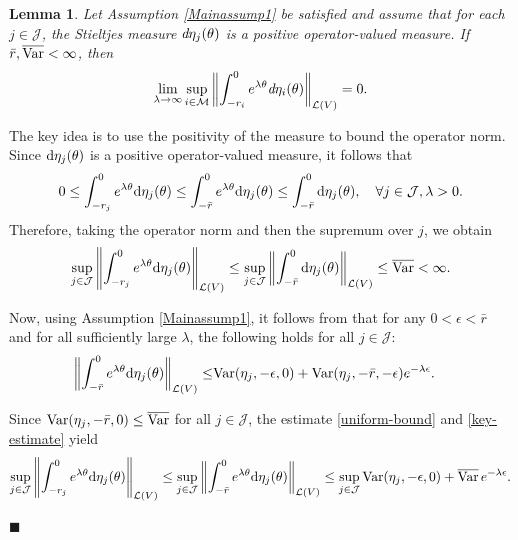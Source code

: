 \documentclass[onecolumn]{autart}
\newtheorem{lemma}{Lemma}[section]
\numberwithin{equation}{section}
\newenvironment{proof}{{\it Proof: \enspace}}{\hfill $\blacksquare$\par}
\begin{document}
	\begin{lemma}\label{tool}
		Let Assumption \ref{Mainassump1} be satisfied and assume that for each $ j \in \mathcal{J} $, the Stieltjes measure $  \emph{d} \eta_j(\theta)$ is a positive operator-valued measure. If $ \bar{r}, \overline{{\rm Var}}< \infty $, then
		\begin{align*}
			\lim_{\lambda \to \infty} \sup_{i \in \mathcal{M}} \left\| \int_{-r_i}^{0} e^{\lambda \theta} \emph{d}\eta_i(\theta) \right\|_{\mathcal{L}(V)} = 0.
		\end{align*}
	\end{lemma}
	\begin{proof}
		The key idea is to use the positivity of the measure to bound the operator norm. Since ${\rm d}\eta_j(\theta)$ is a positive operator-valued measure, it follows that
		\begin{align*}
			0 \le \int_{-r_j}^{0} e^{\lambda \theta} {\rm d}\eta_j(\theta) \le \int_{-\bar{r}}^{0} e^{\lambda \theta} {\rm d}\eta_j(\theta) \le \int_{-\bar{r}}^{0} {\rm d}\eta_j(\theta),\quad \forall j\in \mathcal{J},\lambda>0.
		\end{align*}
		Therefore, taking the operator norm and then the supremum over $ j$, we obtain
		\begin{align}\label{uniform-bound}
			\sup_{j \in \mathcal{J}} \left\| \int_{-r_j}^{0} e^{\lambda \theta}  {\rm d} \eta_j(\theta) \right\|_{\mathcal{L}(V)} \le \sup_{j \in \mathcal{J}} \left\|\displaystyle \int_{-\bar{r}}^{0} {\rm d}\eta_j(\theta) \right\|_{\mathcal{L}(V)} \le \overline{{\rm Var}} < \infty.
		\end{align}
		
		Now, using Assumption \ref{Mainassump1}, it follows from \cite[Estimate~(3.12)]{BSc} that for any $ 0 < \epsilon < \bar{r}$ and for all sufficiently large $\lambda $, the following holds for all $j \in \mathcal{J} $:
		\begin{align}\label{key-estimate}
			\left\| \int_{-\bar{r}}^{0} e^{\lambda \theta} {\rm d}\eta_j(\theta) \right\|_{\mathcal{L}(V)} \le & {\rm Var} (\eta_j, -\epsilon, 0)
			+ {\rm Var} (\eta_j, -\bar{r}, -\epsilon) e^{-\lambda \epsilon}.
		\end{align}
		
		
		Since ${{\rm Var}}(\eta_j, -\bar{r},0) \le \overline{{\rm Var}}$ for all $j \in \mathcal{J}$, the estimate \eqref{uniform-bound} and \eqref{key-estimate} yield
		\begin{align*}
			\sup_{j \in \mathcal{J}} \left\| \int_{-r_j}^{0} e^{\lambda \theta} {\rm d}\eta_j(\theta) \right\|_{\mathcal{L}(V)}  \le \sup_{j \in \mathcal{J}} \left\| \int_{-\bar{r}}^{0} e^{\lambda \theta} {\rm d}\eta_j(\theta) \right\|_{\mathcal{L}(V)}
			\le \sup_{j \in \mathcal{J}} {\rm Var} (\eta_j, -\epsilon, 0) + \overline{{\rm Var}} \, e^{-\lambda \epsilon}.
		\end{align*}
		

\end{proof}
\end{document}
